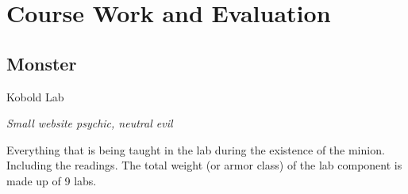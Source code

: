 \documentclass[../CMPUT-404-Notes.tex]{subfiles}
\begin{document}
\chapter{Course Work and Evaluation}
\section{Monster}
\begin{monsterbox}{Kobold Lab}
    \begin{hangingpar}
        \textit{Small website psychic, neutral evil}
    \end{hangingpar}
    \dndline
    \basics[
        armorclass = 5,
        hitpoints = 20,
        speed = {1-2 weeks}
    ]
    \dndline
    \stats[
        STR = \stat{7},
        DEX = \stat{15},
        CON = \stat{9},
        INT = \stat{8},
        WIS = \stat{7},
        CHA = \stat{8},
    ]
    \dndline
    \details[
        senses = {darkvision 60 ft., passive Perception 8},
        languages = {Python},
        challenge = {1/8},
    ]
    \dndline
    Everything that is being taught in the lab during the existence of the minion. Including the readings.
    The total weight (or armor class) of the lab component is made up of 9 labs.   


\end{monsterbox}
\end{document}
